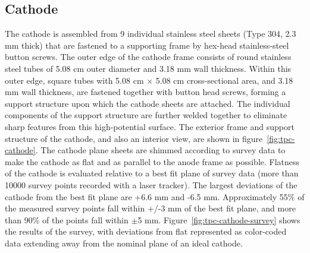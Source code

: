 \subsection{Cathode}
The cathode is assembled from 9 individual stainless steel sheets (Type 304, 2.3 mm thick) that are fastened to a supporting frame by hex-head stainless-steel button screws. The outer edge of the cathode frame consists of round stainless steel tubes of 5.08 cm outer diameter and 3.18 mm wall thickness.  Within this outer edge, square tubes with 5.08 cm $\times$ 5.08 cm cross-sectional area, and 3.18 mm wall thickness, are fastened together with button head screws, forming a support structure upon which the cathode sheets are attached.  The individual components of the support structure are further welded together to eliminate sharp features from this high-potential surface.  The exterior frame and support structure of the cathode, and also an interior view, are shown in figure~\ref{fig:tpc-cathode}. The cathode plane sheets are shimmed according to survey data to make the cathode as flat and as parallel to the anode frame as possible. Flatness of the cathode is evaluated relative to a best fit plane of survey data (more than 10000 survey points recorded with a laser tracker). The largest deviations of the cathode from the best fit plane are +6.6 mm and -6.5 mm. Approximately 55$\%$ of the measured survey points fall within +/-3 mm of the best fit plane, and more than 90$\%$ of the points fall within $\pm$5 mm.  Figure~\ref{fig:tpc-cathode-survey} shows the results of the survey, with deviations from flat represented as color-coded data extending away from the nominal plane of an ideal cathode. %

